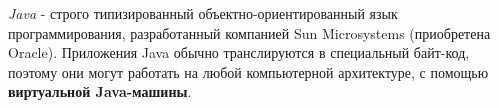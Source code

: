 \begin{frame}
	\frametitle{\insertsection} 
	\framesubtitle{\insertsubsection}
	\textit{Java} - строго типизированный объектно-ориентированный язык программирования, разработанный 
	компанией Sun Microsystems (приобретена Oracle). Приложения Java обычно транслируются в специальный байт-код, поэтому 
	они могут работать на любой компьютерной архитектуре, с помощью \textbf{виртуальной Java-машины}.
\end{frame}
